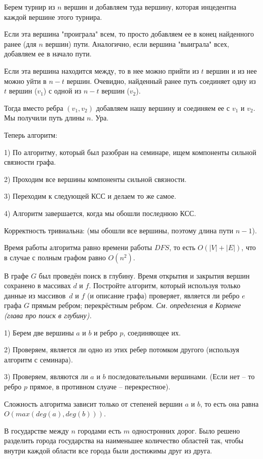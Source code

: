 \documentclass[12pt]{extreport}
\theoremstyle{definiton}
\theoremstyle{definition}
\theoremstyle{definition}
\newcounter{problem}
\newcounter{subproblem}
\def\beforPRskip{
	\bigskip
}
\def\pr{\beforPRskip\noindent\stepcounter{problem}{\bf \theproblem .\;}\setcounter{subproblem}{0}}
\def\prend{
	\bigskip
}
\begin{document}
	Берем турнир из $n$ вершин и добавляем туда вершину, которая инцедентна каждой вершине этого турнира.

	Если эта вершина "проиграла" всем, то просто добавляем ее в конец найденного ранее (для $n$ вершин) пути. Аналогично, если вершина "выиграла" всех, добавляем ее в начало пути.

	Если эта вершина находится между, то в нее можно прийти из $t$ вершин и из нее можно уйти в $n - t$ вершин. Очевидно, найденный ранее путь соединяет одну из $t$ вершин ($v_1$) с одной из $n - t$ вершин ($v_2$).

	Тогда вместо ребра $(v_1, v_2)$ добавляем нашу вершину и соединяем ее с $v_1$ и $v_2$. Мы получили путь длины $n$. Ура.

	Теперь алгоритм:

	1) По алгоритму, который был разобран на семинаре, ищем компоненты сильной связности графа.

	2) Проходим все вершины компоненты сильной связности.

	3) Переходим к следующей КСС и делаем то же самое.

	4) Алгоритм завершается, когда мы обошли последнюю КСС.

	Корректность тривиальна: (мы обошли все вершины, поэтому длина пути $n - 1$).

	Время работы алгоритма равно времени работы $DFS$, то есть $O(|V| + |E|)$, что в случае с полным графом равно $O(n^2)$.

\pr В графе $G$ был проведён поиск в глубину. Время открытия и закрытия вершин сохранено в массивах $d$ и $f$. Постройте алгоритм, который используя только данные из массивов~$d$ и $f$ (и описание графа) проверяет, является ли ребро $e$ графа $G$ \prsubrinline прямым ребром; \prsubrinline перекрёстным ребром. \textsl{См. определения в Кормене (глава про поиск в глубину).  } 

\prend

	1) Берем две вершины $a$ и $b$ и ребро $p$, соединяющее их.

	2) Проверяем, является ли одно из этих ребер потомком другого (используя алгоритм с семинара).

	3) Проверяем, являются ли $a$ и $b$ последовательными вершинами. (Если нет -- то ребро $p$ прямое, в противном слуаче -- перекрестное).

	Сложность алгоритма зависит только от степеней вершин $a$ и $b$, то есть она равна $O(max(deg(a), deg(b)))$.

\pr В государстве между $n$ городами есть $m$ одностронних дорог. Было решено разделить города государства на наименьшее количество областей так, чтобы внутри каждой области все города были достижимы друг из друга.
\end{document}
